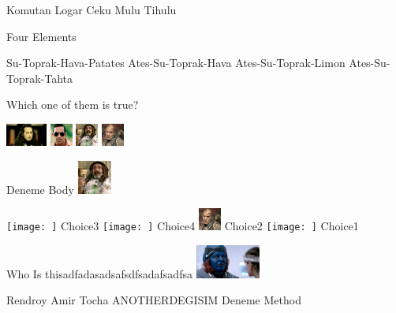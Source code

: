 \documentclass{exam}
\begin{document}
\begin{questions}
\begin{oneparchoices}
\choice Komutan Logar
\choice Ceku
\choice Mulu
\CorrectChoice Tihulu
\end{oneparchoices}
\question Four Elements\newline
\begin{oneparchoices}
\choice Su-Toprak-Hava-Patates
\choice Ates-Su-Toprak-Hava
\choice Ates-Su-Toprak-Limon
\CorrectChoice Ates-Su-Toprak-Tahta
\end{oneparchoices}
\question Which one of them is true?\newline
\begin{oneparchoices}
\choice \includegraphics[height=2em]{komutanlogar.jpeg}
\CorrectChoice \includegraphics[height=2em]{arifisik.jpg}
\choice \includegraphics[height=2em]{faruk.jpg}
\choice \includegraphics[height=2em]{216.jpg}
\end{oneparchoices}
\question Deneme Body\newline
\includegraphics[height=3em]{faruk.jpg} \newline
\begin{oneparchoices}
\choice \texttt{[image: ]}
Choice3
\choice \texttt{[image: ]}
Choice4
\choice \includegraphics[height=2em]{216.jpg}
Choice2
\CorrectChoice \texttt{[image: ]}
Choice1
\end{oneparchoices}
\question Who Is thisadfadasadsafsdfsadafsadfsa\newline
\includegraphics[height=3em]{rendroy2.jpg} \newline
\begin{oneparchoices}
\CorrectChoice Rendroy
\choice Amir Tocha
\CorrectChoice ANOTHERDEGISIM
\choice Deneme Method
\end{oneparchoices}
\end{questions}
\end{document}
